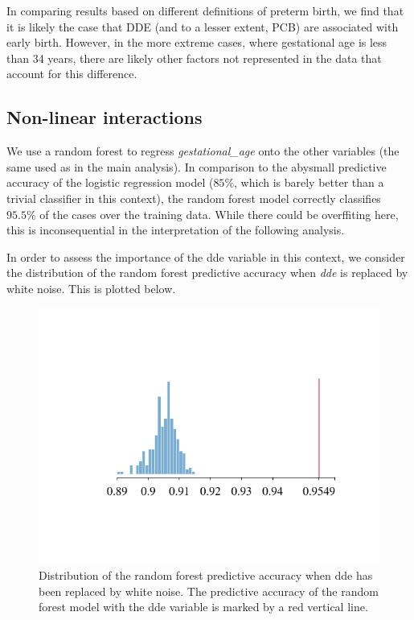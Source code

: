 \documentclass[10pt,]{article}
\begin{document}
In comparing results based on different definitions of preterm birth, we
find that it is likely the case that DDE (and to a lesser extent, PCB)
are associated with early birth. However, in the more extreme cases,
where gestational age is less than 34 years, there are likely other
factors not represented in the data that account for this difference.

\hypertarget{non-linear-interactions}{%
\subsection{Non-linear interactions}\label{non-linear-interactions}}

We use a random forest to regress \emph{gestational\_age} onto the other
variables (the same used as in the main analysis). In comparison to the
abysmall predictive accuracy of the logistic regression model (\(85\%\),
which is barely better than a trivial classifier in this context), the
random forest model correctly classifies \(95.5\%\) of the cases over
the training data. While there could be overffiting here, this is
inconsequential in the interpretation of the following analysis.

In order to assess the importance of the dde variable in this context,
we consider the distribution of the random forest predictive accuracy
when \emph{dde} is replaced by white noise. This is plotted below.

\begin{figure}

{\centering \includegraphics{report_files/figure-latex/unnamed-chunk-10-1} 

}

\caption{Distribution of the random forest predictive accuracy when dde has been replaced by white noise. The predictive accuracy of the random forest model with the dde variable is marked by a red vertical line.}\label{fig:unnamed-chunk-10}
\end{figure}
\end{document}

